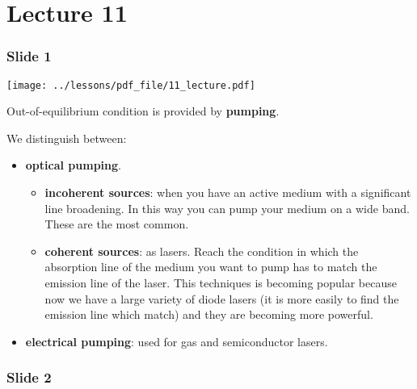 \documentclass[../main/main.tex]{subfiles}
\begin{document}
\pagestyle{plain}

\section{Lecture 11}


\subsubsection*{Slide 1}

\begin{minipage}[]{0.5\linewidth}
\centering
\texttt{[image: ../lessons/pdf\_file/11\_lecture.pdf]}
\end{minipage}
\hspace{0.3cm}\vspace{0.3cm}
\begin{minipage}[c]{0.47\linewidth}

Out-of-equilibrium condition is provided by \textbf{pumping}.

We distinguish between:

\begin{itemize}
\item \textbf{optical pumping}.

\begin{itemize}
\item \textbf{incoherent sources}: when you have an active medium with a significant line broadening. In this way you can pump your medium on a wide band. These are the most common.

\item \textbf{coherent sources}: as lasers. Reach the condition in which the absorption line of the medium you want to pump has to match the emission line of the laser. This techniques is becoming popular because now we have a large variety of diode lasers (it is more easily to find the emission line which match) and they are becoming more powerful.

\end{itemize}

\item \textbf{electrical pumping}: used for gas and semiconductor lasers.

\end{itemize}

\end{minipage}

\subsubsection*{Slide 2}
\end{document}
